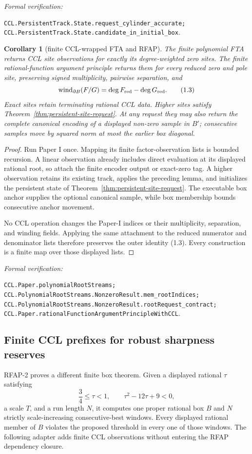 \documentclass[10pt]{article}
\newtheorem{corollary}[theorem]{Corollary}
\theoremstyle{definition}
\theoremstyle{remark}
\newcommand{\leanref}[1]{\par\smallskip\noindent
  \emph{Formal verification:}\par\nobreak
  {\raggedright\nolinkurl{#1}.\par}}
\begin{document}
\leanref{CCL.PersistentTrack.State.request_cylinder_accurate;
CCL.PersistentTrack.State.candidate_in_initial_box}

\begin{corollary}[finite CCL-wrapped FTA and RFAP]
\label{thm:ccl-wrapped-rfap}
The finite polynomial FTA returns CCL site observations for exactly its
degree-weighted zero sites.  The finite rational-function argument principle
returns them for every reduced zero and pole site, preserving signed
multiplicity, pairwise separation, and
\[
 \operatorname{wind}_{\partial B}(F/G)
   =\deg F_{\rm red}-\deg G_{\rm red}.
\tag{1.3}
\]
Exact sites retain terminating rational CCL data.  Higher sites satisfy
Theorem~\ref{thm:persistent-site-request}.  At any request they may also
return the complete canonical encoding of a displayed non-zero sample in
$B'$; consecutive samples move by squared norm at most the earlier box
diagonal.
\end{corollary}

\begin{proof}
Run Paper I once.  Mapping its finite factor-observation lists is bounded
recursion.  A linear observation already includes direct evaluation at its
displayed rational root, so attach the finite encoder output or exact-zero
tag.  A higher observation retains its existing track, applies the preceding
lemma, and initializes the persistent state of
Theorem~\ref{thm:persistent-site-request}.  The executable box anchor supplies
the optional canonical sample, while box membership bounds consecutive
anchor movement.

No CCL operation changes the Paper-I indices or their multiplicity,
separation, and winding fields.  Applying the same attachment to the reduced
numerator and denominator lists therefore preserves the outer identity
(1.3).  Every construction is a finite map over those displayed lists.
\end{proof}

\leanref{CCL.Paper.polynomialRootStreams;
CCL.PolynomialRootStreams.NonzeroResult.mem_rootIndices;
CCL.PolynomialRootStreams.NonzeroResult.rootRequest_contract;
CCL.Paper.rationalFunctionArgumentPrincipleWithCCL}

\subsection{Finite CCL prefixes for robust sharpness reserves}

RFAP-2 proves a different finite box theorem.  Given a displayed rational
$\tau$ satisfying
\[
 \frac34\le\tau<1,
 \qquad \tau^2-12\tau+9<0,
\tag{1.4}
\]
a scale $T$, and a run length $N$, it computes one proper rational box $B$
and $N$ strictly scale-increasing consecutive-best windows.  Every displayed
rational member of $B$ violates the proposed threshold in every one of those
windows.  The following adapter adds finite CCL observations without entering
the RFAP dependency closure.
\end{document}

